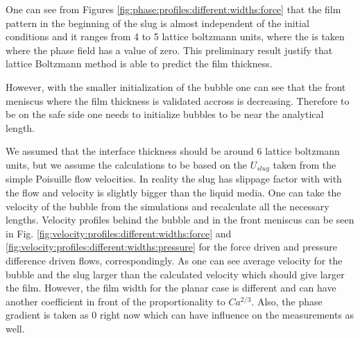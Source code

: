 \documentclass{article}
\begin{document}
One can see from Figures \ref{fig:phase:profiles:different:widths:force} that
the film pattern in the beginning of the slug is almost independent of the
initial conditions and it ranges from 4 to 5 lattice boltzmann units, where the
is taken where the phase field has a value of zero. This preliminary result
justify that lattice Boltzmann method is able to predict the film thickness. 

However, with the smaller initialization of the bubble one can see that the
front meniscus where the film thickness is validated accross is decreasing.
Therefore to be on the safe side one needs to initialize bubbles to be near the
analytical length.

We assumed that the interface thickness should be around $6$ lattice boltzmann
units, but we assume the calculations to be based on the $U_{slug}$ taken from
the simple Poisuille flow velocities. In reality the slug has slippage factor
with with the flow and velocity is slightly bigger than the liquid media. One
can take the velocity of the bubble from the simulations and recalculate all
the necessary lengths. Velocity profiles behind the bubble and in the front
meniscus can be seen in Fig. \ref{fig:velocity:profiles:different:widths:force}
and \ref{fig:velocity:profiles:different:widths:pressure} for the force driven
and pressure difference driven flows, correspondingly. As one can see average
velocity for the bubble and the slug larger than the calculated velocity which
should give larger the film. However, the film width for the planar case is
different and can have another coefficient in front of the proportionality to
$Ca^{2/3}$. Also, the phase gradient is taken as $0$ right now which can have
influence on the measurements as well.
\end{document}
